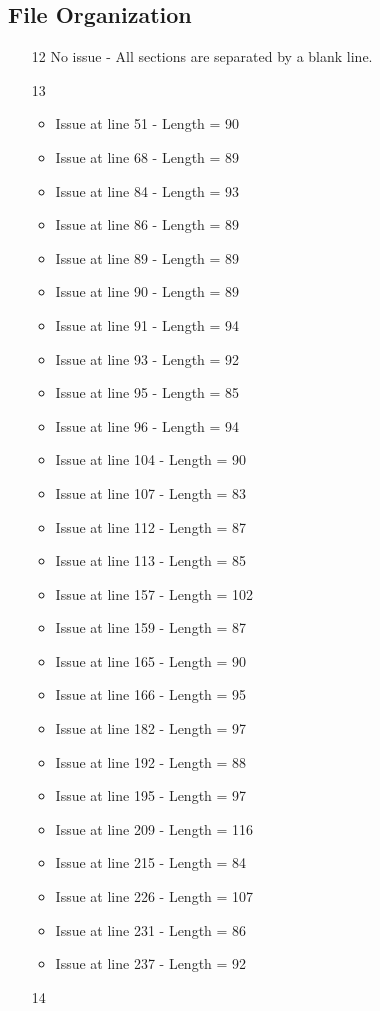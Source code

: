 \subsection{File Organization}
\begin{itemize}
	\item[12] No issue - All sections are separated by a blank line.
	\item[13] \begin{itemize}
\item Issue at line 51 - Length = 90 
\item Issue at line 68 - Length = 89 
\item Issue at line 84 - Length = 93 
\item Issue at line 86 - Length = 89 
\item Issue at line 89 - Length = 89 
\item Issue at line 90 - Length = 89 
\item Issue at line 91 - Length = 94
\item Issue at line 93 - Length = 92
\item Issue at line 95 - Length = 85 
\item Issue at line 96 - Length = 94 
\item Issue at line 104 - Length = 90 
\item Issue at line 107 - Length = 83 
\item Issue at line 112 - Length = 87 
\item Issue at line 113 - Length = 85 
\item Issue at line 157 - Length = 102 
\item Issue at line 159 - Length = 87
\item Issue at line 165 - Length = 90 
\item Issue at line 166 - Length = 95 
\item Issue at line 182 - Length = 97
\item Issue at line 192 - Length = 88
\item Issue at line 195 - Length = 97
\item Issue at line 209 - Length = 116
\item Issue at line 215 - Length = 84
\item Issue at line 226 - Length = 107
\item Issue at line 231 - Length = 86
\item Issue at line 237 - Length = 92
	\end{itemize}
	\item[14] 

\end{itemize}

